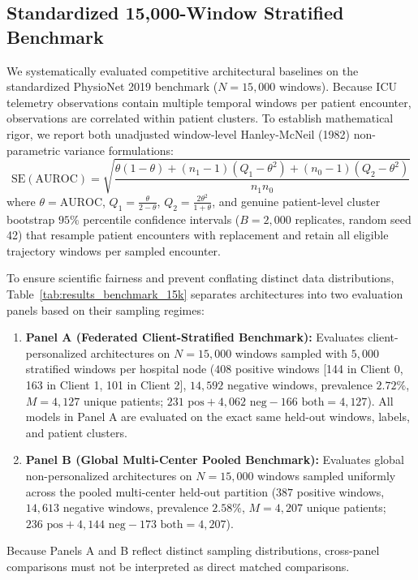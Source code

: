 \documentclass[11pt,a4paper]{article}
\begin{document}
\subsection{Standardized 15,000-Window Stratified Benchmark}
We systematically evaluated competitive architectural baselines on the standardized PhysioNet 2019 benchmark ($N=15,000$ windows). Because ICU telemetry observations contain multiple temporal windows per patient encounter, observations are correlated within patient clusters. To establish mathematical rigor, we report both unadjusted window-level Hanley-McNeil (1982) non-parametric variance formulations:
\begin{equation}
\text{SE}(\text{AUROC}) = \sqrt{\frac{\theta(1-\theta) + (n_1 - 1)(Q_1 - \theta^2) + (n_0 - 1)(Q_2 - \theta^2)}{n_1 n_0}}
\end{equation}
where $\theta = \text{AUROC}$, $Q_1 = \frac{\theta}{2 - \theta}$, $Q_2 = \frac{2\theta^2}{1 + \theta}$, and genuine patient-level cluster bootstrap $95\%$ percentile confidence intervals ($B=2,000$ replicates, random seed 42) that resample patient encounters with replacement and retain all eligible trajectory windows per sampled encounter.

To ensure scientific fairness and prevent conflating distinct data distributions, Table~\ref{tab:results_benchmark_15k} separates architectures into two evaluation panels based on their sampling regimes:
\begin{enumerate}
    \item \textbf{Panel A (Federated Client-Stratified Benchmark):} Evaluates client-personalized architectures on $N=15,000$ windows sampled with $5,000$ stratified windows per hospital node ($408$ positive windows [144 in Client 0, 163 in Client 1, 101 in Client 2], $14,592$ negative windows, prevalence $2.72\%$, $M=4,127$ unique patients; $231 \text{ pos} + 4,062 \text{ neg} - 166 \text{ both} = 4,127$). All models in Panel A are evaluated on the exact same held-out windows, labels, and patient clusters.
    \item \textbf{Panel B (Global Multi-Center Pooled Benchmark):} Evaluates global non-personalized architectures on $N=15,000$ windows sampled uniformly across the pooled multi-center held-out partition ($387$ positive windows, $14,613$ negative windows, prevalence $2.58\%$, $M=4,207$ unique patients; $236 \text{ pos} + 4,144 \text{ neg} - 173 \text{ both} = 4,207$).
\end{enumerate}
Because Panels A and B reflect distinct sampling distributions, cross-panel comparisons must not be interpreted as direct matched comparisons.
\end{document}
